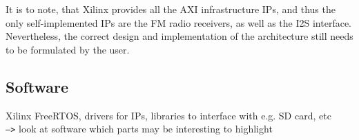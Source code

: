 It is to note, that Xilinx provides all the AXI infrastructure IPs, and thus the only self-implemented IPs are the FM radio receivers, as well as the I2S interface.
Nevertheless, the correct design and implementation of the architecture still needs to be formulated by the user.

\subsection{Software}

Xilinx FreeRTOS,
drivers for IPs, libraries to interface with e.g. SD card, etc\\
\texttt{--->} look at software which parts may be interesting to highlight
